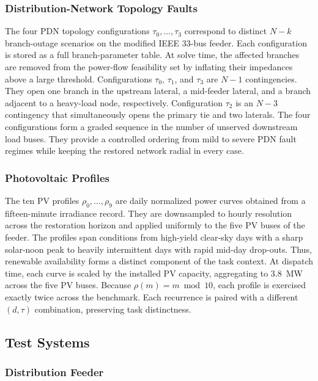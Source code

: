 \subsubsection{Distribution-Network Topology Faults}
\label{app:tau}

The four PDN topology configurations $\tau_0,\dots,\tau_3$ correspond to distinct $N{-}k$ branch-outage scenarios on the modified IEEE 33-bus feeder. Each configuration is stored as a full branch-parameter table. At solve time, the affected branches are removed from the power-flow feasibility set by inflating their impedances above a large threshold. Configurations $\tau_0$, $\tau_1$, and $\tau_3$ are $N{-}1$ contingencies. They open one branch in the upstream lateral, a mid-feeder lateral, and a branch adjacent to a heavy-load node, respectively. Configuration $\tau_2$ is an $N{-}3$ contingency that simultaneously opens the primary tie and two laterals. The four configurations form a graded sequence in the number of unserved downstream load buses. They provide a controlled ordering from mild to severe PDN fault regimes while keeping the restored network radial in every case.

\subsubsection{Photovoltaic Profiles}
\label{app:rho}

The ten PV profiles $\rho_0,\dots,\rho_9$ are daily normalized power curves obtained from a fifteen-minute irradiance record. They are downsampled to hourly resolution across the restoration horizon and applied uniformly to the five PV buses of the feeder. The profiles span conditions from high-yield clear-sky days with a sharp solar-noon peak to heavily intermittent days with rapid mid-day drop-outs. Thus, renewable availability forms a distinct component of the task context. At dispatch time, each curve is scaled by the installed PV capacity, aggregating to $3.8$~MW across the five PV buses. Because $\rho(m)=m\bmod 10$, each profile is exercised exactly twice across the benchmark. Each recurrence is paired with a different $(d,\tau)$ combination, preserving task distinctness.

\subsection{Test Systems}
\label{app:systems}

\subsubsection{Distribution Feeder}
\label{app:pdn_system}

